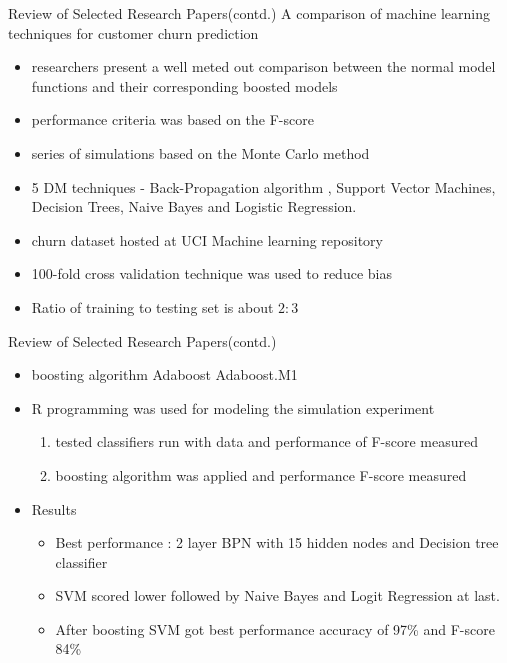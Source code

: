 \documentclass{beamer}
\begin{document}
\begin{frame}{Review of Selected Research Papers(contd.)}
	A comparison of machine learning techniques for customer churn prediction
	\begin{itemize}
		\item researchers present a well meted out comparison between the normal model functions
		and their corresponding boosted models
		\item performance criteria was based on the F-score
		\item series of simulations based on the Monte Carlo method
		\item 5 DM techniques - Back-Propagation algorithm , Support Vector Machines, Decision Trees, Naive Bayes and
		Logistic Regression.
		\item churn dataset hosted at UCI Machine learning repository
		\item 100-fold cross validation technique was used to reduce bias
		\item Ratio of training to testing set is about $2 : 3$
	\end{itemize}
\end{frame}

\begin{frame}{Review of Selected Research Papers(contd.)}
	\begin{itemize}
		\item boosting algorithm Adaboost Adaboost.M1
		\item R programming was used for modeling the simulation experiment
		\begin{enumerate}
			\item tested classifiers run with data and performance of F-score measured
			\item boosting algorithm was applied and performance F-score measured
		\end{enumerate}
		\item Results
		\begin{itemize}
			\item Best performance : 2 layer BPN with 15 hidden nodes and Decision tree classifier
			\item SVM scored lower followed by Naive Bayes and Logit Regression at last.
			\item After boosting SVM got best performance accuracy of 97\% and F-score 84\%
		\end{itemize}
	\end{itemize}
\end{frame}
\end{document}
